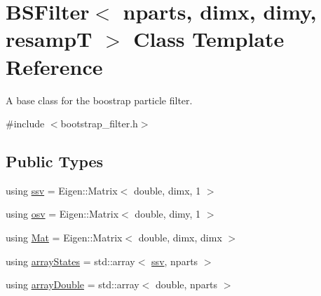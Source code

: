 \hypertarget{classBSFilter}{}\section{B\+S\+Filter$<$ nparts, dimx, dimy, resampT $>$ Class Template Reference}
\label{classBSFilter}


A base class for the boostrap particle filter.  




{\ttfamily \#include $<$bootstrap\+\_\+filter.\+h$>$}

\subsection*{Public Types}
\begin{DoxyCompactItemize}
\item 
using \hyperlink{classBSFilter_acc4caec4908ad134814082c39c3b8bef}{ssv} = Eigen\+::\+Matrix$<$ double, dimx, 1 $>$
\item 
using \hyperlink{classBSFilter_aea27600dd7c5af20fa7a0fc57f18b0a2}{osv} = Eigen\+::\+Matrix$<$ double, dimy, 1 $>$
\item 
using \hyperlink{classBSFilter_afdce3784f96aac7305cdeeabaacdf521}{Mat} = Eigen\+::\+Matrix$<$ double, dimx, dimx $>$
\item 
using \hyperlink{classBSFilter_a39f954add54c601315e1325aba52dd59}{array\+States} = std\+::array$<$ \hyperlink{classBSFilter_acc4caec4908ad134814082c39c3b8bef}{ssv}, nparts $>$
\item 
using \hyperlink{classBSFilter_aac1c14ca429c702932574931ee2c6f0e}{array\+Double} = std\+::array$<$ double, nparts $>$
\end{DoxyCompactItemize}
